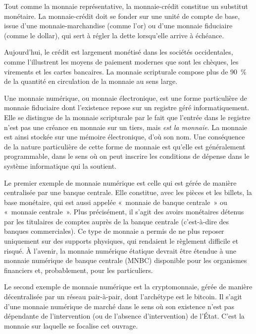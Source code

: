 Tout comme la monnaie représentative, la monnaie-crédit constitue un substitut monétaire. La monnaie-crédit doit se fonder sur une unité de compte de base, issue d'une monnaie-marchandise (comme l'or) ou d'une monnaie fiduciaire (comme le dollar), qui sert à régler la dette lorsqu'elle arrive à échéance.

Aujourd'hui, le crédit est largement monétisé dans les sociétés occidentales, comme l'illustrent les moyens de paiement modernes que sont les chèques, les virements et les cartes bancaires. La monnaie scripturale compose plus de 90~\% de la quantité en circulation de la monnaie au sens large.


Une monnaie numérique, ou monnaie électronique, est une forme particulière de monnaie fiduciaire dont l'existence repose sur un registre géré informatiquement. Elle se distingue de la monnaie scripturale par le fait que l'entrée dans le registre n'est pas une créance en monnaie sur un tiers, mais \emph{est la monnaie}. La monnaie est ainsi stockée sur une mémoire électronique, d'où son nom. Une conséquence de la nature particulière de cette forme de monnaie est qu'elle est généralement programmable, dans le sens où on peut inscrire les conditions de dépense dans le système informatique qui la soutient.

Le premier exemple de monnaie numérique est celle qui est gérée de manière centralisée par une banque centrale. Elle constitue, avec les pièces et les billets, la base monétaire, qui est aussi appelée «~monnaie de banque centrale~» ou «~monnaie centrale~». Plus précisément, il s'agit des avoirs monétaires détenus par les titulaires de comptes auprès de la banque centrale (c'est-à-dire des banques commerciales). Ce type de monnaie a permis de ne plus reposer uniquement sur des supports physiques, qui rendaient le règlement difficile et risqué. À l'avenir, la monnaie numérique étatique devrait être étendue à une monnaie numérique de banque centrale (MNBC) disponible pour les organismes financiers et, probablement, pour les particuliers. %

Le second exemple de monnaie numérique est la cryptomonnaie, gérée de manière décentralisée par un réseau pair-à-pair, dont l'archétype est le bitcoin. Il s'agit d'une monnaie numérique de marché dans le sens où son existence n'est pas dépendante de l'intervention (ou de l'absence d'intervention) de l'État. C'est la monnaie sur laquelle se focalise cet ouvrage.

